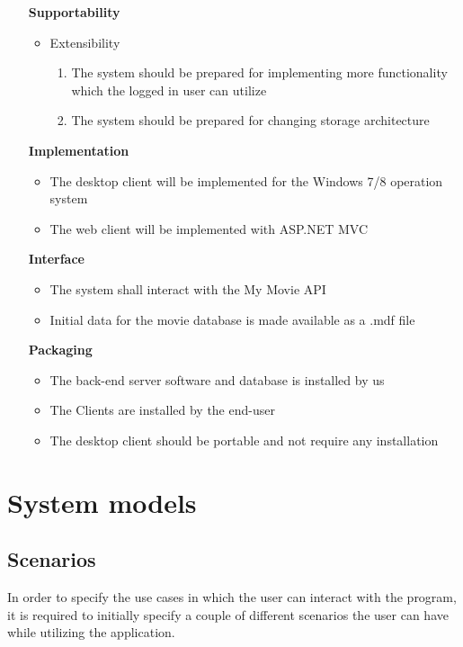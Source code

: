 \begin{itemize}
\vspace{0.2cm}
\item[\textbf{Supportability}]
\begin{itemize}
\item Extensibility
\begin{enumerate}
\item The system should be prepared for implementing more functionality which the logged in user can utilize
\item The system should be prepared for changing storage architecture
\end{enumerate}
\end{itemize}

\vspace{0.2cm}
\item[\textbf{Implementation}]
\begin{itemize}
\item The desktop client will be implemented for the Windows 7/8 operation system
\item The web client will be implemented with ASP.NET MVC
\end{itemize}

\vspace{0.2cm}
\item[\textbf{Interface}]
\begin{itemize}
\item The system shall interact with the My Movie API
\item Initial data for the movie database is made available as a .mdf file
\end{itemize}

\vspace{0.2cm}
\item[\textbf{Packaging}]
\begin{itemize}
\item The back-end server software and database is installed by us
\item The Clients are installed by the end-user
\item The desktop client should be portable and not require any installation
\end{itemize}

\end{itemize}


\section{System models}

\subsection{Scenarios}
In order to specify the use cases in which the user can interact with the program, it is required to initially specify a couple of different scenarios the user can have while utilizing the application.


